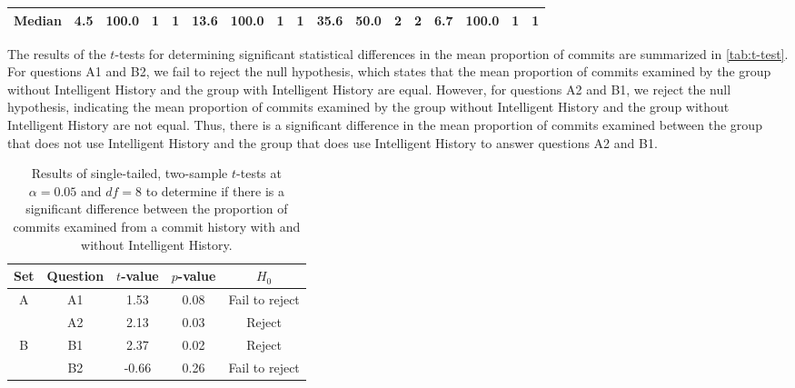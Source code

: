 \begin{landscape}
\begin{table}
\begin{tabular}{@{}ccccccccccccccccc@{}}
      \multicolumn{1}{l|}{Median}         & 4.5      & 100.0     & 1    & \multicolumn{1}{c|}{1}    & 13.6                     & 100.0                    & 1                        & \multicolumn{1}{c|}{1}    & 35.6      & 50.0                     & 2                        & \multicolumn{1}{c|}{2}    & 6.7                      & 100.0                    & 1                        & 1                        \\ \bottomrule
    \end{tabular}
    \label{tab:Results-Quantitative-BA}
  \end{table}
\end{landscape}

The results of the $t$-tests for determining significant statistical differences in the mean proportion of commits are summarized in \autoref{tab:t-test}.
For questions A1 and B2, we fail to reject the null hypothesis, which states that the mean proportion of commits examined by the group without Intelligent History and the group with Intelligent History are equal.
However, for questions A2 and B1, we reject the null hypothesis, indicating the mean proportion of commits examined by the group without Intelligent History and the group without Intelligent History are not equal.
Thus, there is a significant difference in the mean proportion of commits examined between the group that does not use Intelligent History and the group that does use Intelligent History to answer questions A2 and B1.

\begin{table}[h]
  \caption{
    Results of single-tailed, two-sample $t$-tests at $\alpha = 0.05$ and $df = 8$ to determine if there is a significant difference between the proportion of commits examined from a commit history
    with and without Intelligent History.
  }
  \centering
  \begin{tabular}{@{}ccccc@{}}
    \toprule
    Set                                     & Question               & \multicolumn{1}{c}{$t$-value} & \multicolumn{1}{c}{$p$-value} & $H_{0}$ \\ \midrule
    \multicolumn{1}{c|}{\multirow{2}{*}{A}} & \multicolumn{1}{c|}{A1} & 1.53                        & 0.08                        & Fail to reject   \\ \cmidrule(l){2-5} 
    \multicolumn{1}{c|}{}                   & \multicolumn{1}{c|}{A2} & 2.13                        & 0.03                        & Reject   \\ \midrule
    \multicolumn{1}{c|}{\multirow{2}{*}{B}} & \multicolumn{1}{c|}{B1} & 2.37                        & 0.02                        & Reject   \\ \cmidrule(l){2-5} 
    \multicolumn{1}{c|}{}                   & \multicolumn{1}{c|}{B2} & -0.66                       & 0.26                        & Fail to reject   \\ \bottomrule
  \end{tabular}
  \label{tab:t-test}
\end{table}

